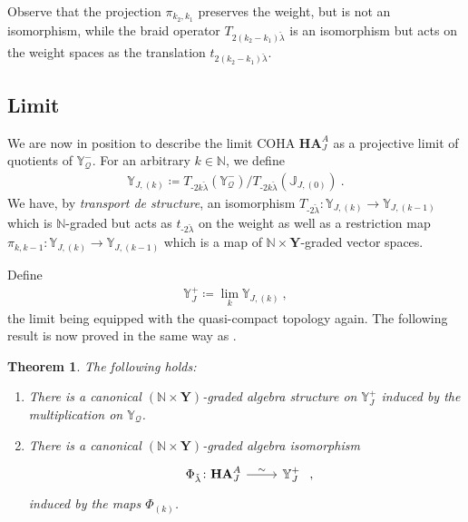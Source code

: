 \documentclass[reqno,a4paper]{amsart}
\newcommand{\J}{\mathbb{J}}
\newcommand{\N}{\mathbb{N}}
\newcommand{\Y}{\mathbb{Y}}
\newcommand{\bfY}{\mathbf{Y}}
\newcommand{\qv}{\mathcal{Q}}
\newcommand{\Llambda}{{\check{\lambda}}}
\newcommand{\rootlattice}{\bfY}
\newcommand{\coha}{\mathbf{HA}}
\theoremstyle{basic-theorem}
\newtheorem{theorem}{Theorem}[section]
\numberwithin{equation}{section}
\begin{document}
Observe that the projection $\pi_{k_2,k_1}$ preserves the weight, but is not an isomorphism, while the braid operator $T_{2(k_2-k_1)\Llambda}$ is an isomorphism but acts on the weight spaces as the translation $t_{2(k_2-k_1)\Llambda}$.
  
\subsection{Limit}\label{subsec:def-limit-affine-Yangian}

We are now in position to describe the limit COHA $\coha^A_{J}$ as a projective limit of quotients of $\Y^-_\qv$. For an arbitrary $k \in \N$, we define
\begin{align}
	\Y_{J, (k)}\coloneqq T_{\textrm{-}2k\Llambda}(\Y^-_\qv)/T_{\textrm{-}2k\Llambda}(\J_{J,(0)})\ .
\end{align}
We have, by \textit{transport de structure}, an isomorphism $T_{\textrm{-}2\Llambda}\colon \Y_{J, (k)} \to \Y_{J, (k-1)}$ which is $\N$-graded but acts as $t_{\textrm{-}2\Llambda}$ on the weight as well as a restriction map $\pi_{k,k-1}\colon \Y_{J, (k)} \to \Y_{J, (k-1)}$ which is a map of $\N \times \rootlattice$-graded vector spaces. 

Define
\begin{align}
	\Y_J^+ \coloneqq \lim_k \Y_{J, (k)}\ ,
\end{align}
the limit being equipped with the quasi-compact topology again. The following result is now proved in the same way as \cite[Theorem~\ref*{COHA-Yangian-thm:coha-surface-as-limit2}]{DPSSV-3}.
\begin{theorem}\label{thm:coha-surface-as-limit2}
	The following holds:
	\begin{enumerate}\itemsep0.2cm
		\item \label{item:coha-surface-as-limit2.1} There is a canonical $(\N \times \rootlattice)$-graded algebra structure on $\Y_J^+$ induced by the multiplication on $\Y_\qv$.

		\item \label{item:coha-surface-as-limit2.2} There is a canonical $(\N \times \rootlattice)$-graded algebra isomorphism
		\begin{align}
			\begin{tikzcd}[ampersand replacement=\&]
				\Phi_{\Llambda}\colon \coha_J^A\ar{r}{\sim} \& \Y_J^+
			\end{tikzcd}\ ,
		\end{align}
		induced by the maps $\Phi_{(k)}$.
	\end{enumerate}
\end{theorem}
\end{document}
